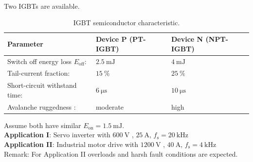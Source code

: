 Two IGBTs are available.

\begin{table}[ht]
    \centering
    \begin{tabular}{lll}
        \toprule
        Parameter  & \textbf{Device P (PT-IGBT)} & \textbf{Device N (NPT-IGBT)} \\
        \midrule
        Switch off energy loss $E_\mathrm{off}$: & $\SI{2.5}{\milli\joule}$  & $\SI{4}{\milli\joule}$  \\
        Tail-current fraction: & $\SI{15}{\percent}$ & $\SI{25}{\percent}$ \\
        Short-circuit withstand time: & $\SI{6}{\micro\second}$ & $\SI{10}{\micro\second}$ \\
        Avalanche ruggedness : & moderate & high \\
        \bottomrule
    \end{tabular}
    \caption{IGBT semiconductor characteristic.}
    \label{table:igbt_task4_device}
\end{table}

Assume both have similar $E_\mathrm{on} = \SI{1.5}{\milli\joule}$.\\

\textbf{Application I}: Servo inverter with $\SI{600}{\volt}$ , $\SI{25}{\ampere}$, $f_\mathrm{s} = \SI{20}{\kilo\hertz}$ \\
\textbf{Application II}: Industrial motor drive  with $\SI{1200}{\volt}$ , $\SI{40}{\ampere}$, $f_\mathrm{s} = \SI{4}{\kilo\hertz}$ \\
Remark: For Application II overloads and harsh fault conditions are expected.


